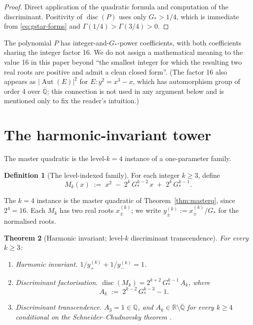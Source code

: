 \documentclass[11pt,reqno]{amsart}
\theoremstyle{plain}
\newtheorem{theorem}{Theorem}[section]
\theoremstyle{definition}
\newtheorem{definition}[theorem]{Definition}
\theoremstyle{remark}
\numberwithin{equation}{section}
\newcommand{\Gstar}{G_{\!*}}
\newcommand{\Aut}{\operatorname{Aut}}
\newcommand{\disc}{\operatorname{disc}}
\begin{document}
\begin{proof}
Direct application of the quadratic formula and computation of the
discriminant. Positivity of $\disc(P)$ uses only $\Gstar > 1/4$,
which is immediate from \eqref{eq:gstar-forms} and
$\Gamma(1/4) > \Gamma(3/4) > 0$.
\end{proof}

The polynomial $P$ has integer-and-$\Gstar$-power coefficients, with
both coefficients sharing the integer factor 16. We do not assign a
mathematical meaning to the value 16 in this paper beyond ``the
smallest integer for which the resulting two real roots are positive
and admit a clean closed form''. (The factor 16 also appears as
$|\Aut(E)|^{2}$ for $E\colon y^{2} = x^{3}-x$, which has automorphism
group of order 4 over $\overline{\mathbb{Q}}$; this connection is not
used in any argument below and is mentioned only to fix the reader's
intuition.)

\section{The harmonic-invariant tower}
\label{sec:tower}

The master quadratic is the level-$k=4$ instance of a one-parameter
family.

\begin{definition}[The level-indexed family]
For each integer $k \geq 3$, define
\begin{equation}
\label{eq:tower-def}
  M_{k}(x) \;:=\; x^{2} \;-\; 2^{k}\,\Gstar^{k-2}\,x \;+\; 2^{k}\,\Gstar^{k-1}.
\end{equation}
\end{definition}

The $k=4$ instance is the master quadratic of
Theorem~\ref{thm:masterq}, since $2^{4} = 16$. Each $M_{k}$ has two
real roots $x_{\pm}^{(k)}$; we write $y_{\pm}^{(k)} :=
x_{\pm}^{(k)}/\Gstar$ for the normalised roots.

\begin{theorem}[Harmonic invariant; level-$k$ discriminant transcendence]
\label{thm:tower}
For every $k \geq 3$:
\begin{enumerate}[label=\textup{(\roman*)}, leftmargin=*]
\item \emph{Harmonic invariant.} $1/y_{+}^{(k)} + 1/y_{-}^{(k)} = 1$.
\item \emph{Discriminant factorisation.}
$\disc(M_{k}) = 2^{k+2}\,\Gstar^{k-1}\,A_{k}$, where
\begin{equation}
\label{eq:Ak}
  A_{k} \;:=\; 2^{k-2}\,\Gstar^{k-3} - 1.
\end{equation}
\item \emph{Discriminant transcendence.} $A_{3} = 1 \in \mathbb{Q}$,
and $A_{k} \in \mathbb{R} \setminus \overline{\mathbb{Q}}$ for every
$k \geq 4$ \emph{conditional on the Schneider--Chudnovsky theorem
\cite{chudnovsky1976}.}
\end{enumerate}
\end{theorem}
\end{document}
